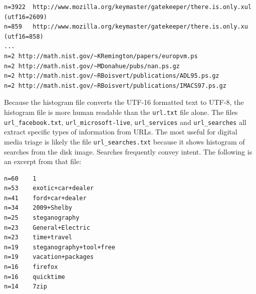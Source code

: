 \lstset{style=customfile}
\begin{lstlisting}
n=3922	http://www.mozilla.org/keymaster/gatekeeper/there.is.only.xul	(utf16=2609)
n=859	http://www.mozilla.org/keymaster/gatekeeper/there.is.only.xu	(utf16=858)
...
n=2	http://math.nist.gov/~KRemington/papers/europvm.ps
n=2	http://math.nist.gov/~MDonahue/pubs/nan.ps.gz
n=2	http://math.nist.gov/~RBoisvert/publications/ADL95.ps.gz
n=2	http://math.nist.gov/~RBoisvert/publications/IMACS97.ps.gz
\end{lstlisting}
Because the histogram file converts the UTF-16 formatted text to UTF-8, the histogram file is more human readable than the \texttt{url.txt} file alone. The files \texttt{url\_facebook.txt}, \texttt{url\_microsoft-live}, \texttt{url\_services} and \texttt{url\_searches} all extract specific types of information from URLs. The most useful for digital media triage is likely the file \texttt{url\_searches.txt} because it shows histogram of searches from the disk image. Searches frequently convey intent. The following is an excerpt from that file:
\lstset{style=customfile}
\begin{lstlisting}
n=60	1
n=53	exotic+car+dealer
n=41	ford+car+dealer
n=34	2009+Shelby
n=25	steganography
n=23	General+Electric
n=23	time+travel
n=19	steganography+tool+free
n=19	vacation+packages
n=16	firefox
n=16	quicktime
n=14	7zip
\end{lstlisting}


